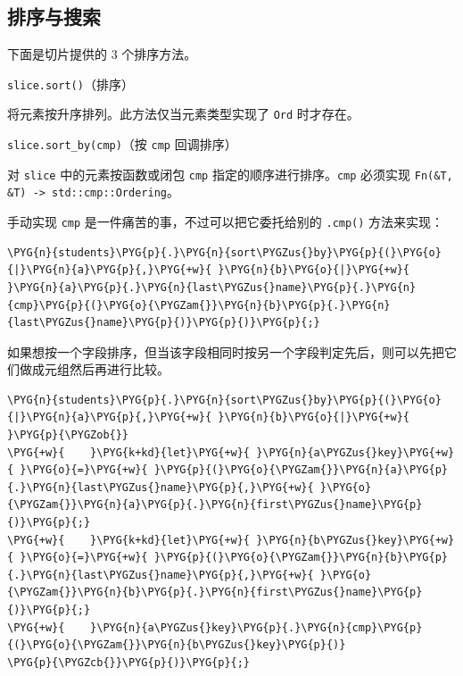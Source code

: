 \subsection{排序与搜索}

下面是切片提供的 3 个排序方法。

\begin{mySidenote}
\texttt{slice.sort()}（排序）
\end{mySidenote}

将元素按升序排列。此方法仅当元素类型实现了 \texttt{Ord} 时才存在。

\begin{myNote}
\texttt{slice.sort\_by(cmp)}（按 \texttt{cmp} 回调排序）
\end{myNote}

对 \texttt{slice} 中的元素按函数或闭包 \texttt{cmp} 指定的顺序进行排序。\texttt{cmp} 必须实现 \texttt{Fn(\&T, \&T) -> std::cmp::Ordering}。

手动实现 \texttt{cmp} 是一件痛苦的事，不过可以把它委托给别的 \texttt{.cmp()} 方法来实现：

\begin{Verbatim}[commandchars=\\\{\},breaklines=true,breakanywhere=true,fontsize=\codefont,xleftmargin=17bp]
\PYG{n}{students}\PYG{p}{.}\PYG{n}{sort\PYGZus{}by}\PYG{p}{(}\PYG{o}{|}\PYG{n}{a}\PYG{p}{,}\PYG{+w}{ }\PYG{n}{b}\PYG{o}{|}\PYG{+w}{ }\PYG{n}{a}\PYG{p}{.}\PYG{n}{last\PYGZus{}name}\PYG{p}{.}\PYG{n}{cmp}\PYG{p}{(}\PYG{o}{\PYGZam{}}\PYG{n}{b}\PYG{p}{.}\PYG{n}{last\PYGZus{}name}\PYG{p}{)}\PYG{p}{)}\PYG{p}{;}
\end{Verbatim}

如果想按一个字段排序，但当该字段相同时按另一个字段判定先后，则可以先把它们做成元组然后再进行比较。

\begin{Verbatim}[commandchars=\\\{\},breaklines=true,breakanywhere=true,fontsize=\codefont,xleftmargin=17bp]
\PYG{n}{students}\PYG{p}{.}\PYG{n}{sort\PYGZus{}by}\PYG{p}{(}\PYG{o}{|}\PYG{n}{a}\PYG{p}{,}\PYG{+w}{ }\PYG{n}{b}\PYG{o}{|}\PYG{+w}{ }\PYG{p}{\PYGZob{}}
\PYG{+w}{    }\PYG{k+kd}{let}\PYG{+w}{ }\PYG{n}{a\PYGZus{}key}\PYG{+w}{ }\PYG{o}{=}\PYG{+w}{ }\PYG{p}{(}\PYG{o}{\PYGZam{}}\PYG{n}{a}\PYG{p}{.}\PYG{n}{last\PYGZus{}name}\PYG{p}{,}\PYG{+w}{ }\PYG{o}{\PYGZam{}}\PYG{n}{a}\PYG{p}{.}\PYG{n}{first\PYGZus{}name}\PYG{p}{)}\PYG{p}{;}
\PYG{+w}{    }\PYG{k+kd}{let}\PYG{+w}{ }\PYG{n}{b\PYGZus{}key}\PYG{+w}{ }\PYG{o}{=}\PYG{+w}{ }\PYG{p}{(}\PYG{o}{\PYGZam{}}\PYG{n}{b}\PYG{p}{.}\PYG{n}{last\PYGZus{}name}\PYG{p}{,}\PYG{+w}{ }\PYG{o}{\PYGZam{}}\PYG{n}{b}\PYG{p}{.}\PYG{n}{first\PYGZus{}name}\PYG{p}{)}\PYG{p}{;}
\PYG{+w}{    }\PYG{n}{a\PYGZus{}key}\PYG{p}{.}\PYG{n}{cmp}\PYG{p}{(}\PYG{o}{\PYGZam{}}\PYG{n}{b\PYGZus{}key}\PYG{p}{)}
\PYG{p}{\PYGZcb{}}\PYG{p}{)}\PYG{p}{;}
\end{Verbatim}

